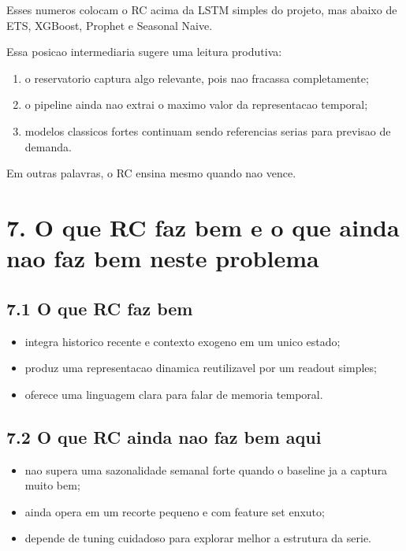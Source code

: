 \documentclass[12pt]{article}
\providecommand{\tightlist}{%
  \setlength{\itemsep}{0pt}\setlength{\parskip}{0pt}}
\begin{document}
Esses numeros colocam o RC acima da LSTM simples do projeto, mas abaixo de ETS, XGBoost, Prophet e Seasonal Naive.

Essa posicao intermediaria sugere uma leitura produtiva:

\begin{enumerate}
\def\labelenumi{\arabic{enumi}.}
\tightlist
\item
  o reservatorio captura algo relevante, pois nao fracassa completamente;
\item
  o pipeline ainda nao extrai o maximo valor da representacao temporal;
\item
  modelos classicos fortes continuam sendo referencias serias para previsao de demanda.
\end{enumerate}

Em outras palavras, o RC ensina mesmo quando nao vence.

\section{7. O que RC faz bem e o que ainda nao faz bem neste problema}\label{7-o-que-rc-faz-bem-e-o-que-ainda-nao-faz-bem-neste-problema}

\subsection{7.1 O que RC faz bem}\label{71-o-que-rc-faz-bem}

\begin{itemize}
\tightlist
\item
  integra historico recente e contexto exogeno em um unico estado;
\item
  produz uma representacao dinamica reutilizavel por um readout simples;
\item
  oferece uma linguagem clara para falar de memoria temporal.
\end{itemize}

\subsection{7.2 O que RC ainda nao faz bem aqui}\label{72-o-que-rc-ainda-nao-faz-bem-aqui}

\begin{itemize}
\tightlist
\item
  nao supera uma sazonalidade semanal forte quando o baseline ja a captura muito bem;
\item
  ainda opera em um recorte pequeno e com feature set enxuto;
\item
  depende de tuning cuidadoso para explorar melhor a estrutura da serie.
\end{itemize}
\end{document}
